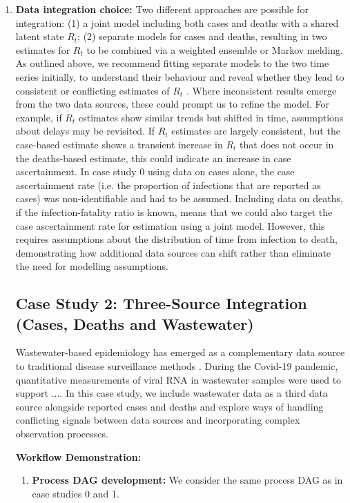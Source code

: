 \documentclass{article}
\begin{document}
\begin{enumerate}
    \item \textbf{Data integration choice:} 
       Two different approaches are possible for integration: (1) a joint model including both cases and deaths with a shared latent state $R_t$; (2) separate models for cases and deaths, resulting in two estimates for $R_t$ to be combined via a weighted ensemble or Markov melding.
        As outlined above, we recommend fitting separate models to the two time series initially, to understand their behaviour and reveal whether they lead to consistent or conflicting estimates of $R_t$ \cite{sherratt2021exploring}. Where inconsistent results emerge from the two data sources, these could prompt us to refine the model. For example, if $R_t$ estimates show similar trends but shifted in time, assumptions about delays may be revisited. If $R_t$ estimates are largely consistent, but the case-based estimate shows a transient increase in $R_t$ that does not occur in the deaths-based estimate, this could indicate an increase in case ascertainment. In case study 0 using data on cases alone, the case ascertainment rate (i.e. the proportion of infections that are reported as cases) was non-identifiable and had to be assumed. Including data on deaths, if the infection-fatality ratio is known, means that we could also target the case ascertainment rate for estimation using a joint model. However, this requires assumptions about the distribution of time from infection to death, demonstrating how additional data sources can shift rather than eliminate the need for modelling assumptions. 

\subsection{Case Study 2: Three-Source Integration (Cases, Deaths and Wastewater)}

Wastewater-based epidemiology has emerged as a complementary data source to traditional disease surveillance methods \cite{keshaviah2023wastewater}. During the Covid-19 pandemic, quantitative measurements of viral RNA in wastewater samples were used to support ....
In this case study, we include wastewater data as a third data source alongside reported cases and deaths and explore ways of handling conflicting signals between data sources and incorporating complex observation processes.

\textbf{Workflow Demonstration:}
\begin{enumerate}
    \item \textbf{Process DAG development:} We consider the same process DAG as in case studies 0 and 1.


\end{enumerate}
\end{enumerate}
\end{document}
